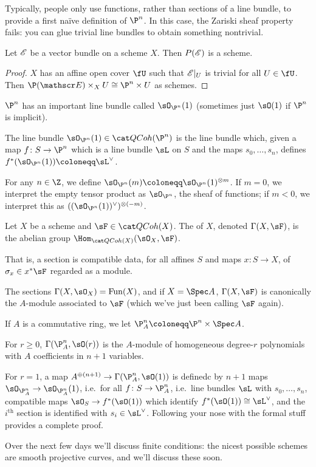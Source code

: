 Typically, people only use functions, rather than sections of a line bundle, to provide a first naïve definition of
$\P^n$. In this case, the Zariski sheaf property fails: you can glue trivial line bundles to obtain something
nontrivial.
\begin{cor}
Let $\mathscr E$ be a vector bundle on a scheme $X$. Then $P(\mathscr E)$ is a scheme.
\end{cor}
\begin{proof}
$X$ has an affine open cover $\fU$ such that $\mathscr E|_U$ is trivial for all $U\in\fU$. Then $\P(\sE)\times_X U\cong
\P^n\times U$ as schemes.
\end{proof}
$\P^n$ has an important line bundle called $\sO_{\P^n}(1)$ (sometimes just $\sO(1)$ if $\P^n$ is implicit).
\begin{defn}
The line bundle $\sO_{\P^n}(1)\in\QCoh(\P^n)$ is the line bundle which, given a map $f\colon S\to\P^n$ which is a
line bundle $\sL$ on $S$ and the maps $s_0,\dotsc,s_n$, defines $f^*(\sO_{\P^n}(1))\coloneqq\sL^\vee$.

For any $n\in\Z$, we define $\sO_{\P^n}(m)\coloneqq\sO_{\P^n}(1)^{\otimes m}$. If $m = 0$, we interpret the empty
tensor product as $\sO_{\P^n}$, the sheaf of functions; if $m < 0$, we interpret this as
$((\sO_{\P^n}(1))^\vee)^{\otimes(-m)}$.
\end{defn}
\begin{defn}
Let $X$ be a scheme and $\sF\in\QCoh(X)$. The  of $X$, denoted $\Gamma(X, \sF)$, is the abelian
group $\Hom_{\QCoh(X)}(\sO_X, \sF)$.
\end{defn}
That is, a section is compatible data, for all affines $S$ and maps $x\colon S\to X$, of $\sigma_x\in x^*\sF$
regarded as a module.

The sections $\Gamma(X,\sO_X) = \Fun(X)$, and if $X = \Spec A$, $\Gamma(X, \sF)$ is canonically the $A$-module
associated to $\sF$ (which we've just been calling $\sF$ again).
\begin{defn}
If $A$ is a commutative ring, we let $\P_A^n\coloneqq \P^n\times\Spec A$.
\end{defn}
\begin{prop}
For $r\ge 0$, $\Gamma(\P_A^n, \sO(r))$ is the $A$-module of homogeneous degree-$r$ polynomials with $A$
coefficients in $n+1$ variables.
\end{prop}
For $r = 1$, a map $A^{\oplus(n+1)}\to\Gamma(\P_A^n, \sO(1))$ is definedc by $n+1$ maps
$\sO_{\P_A^n}\to\sO_{\P_A^n}(1)$, i.e.\ for all $f\colon S\to\P_A^n$, i.e.\ line bundles $\sL$ with
$s_0,\dotsc,s_n$, compatible maps $\sO_S\to f^*(\sO(1))$ which identify $f^*(\sO(1))\cong\sL^\vee$, and the
$i^{\mathrm{th}}$ section is identified with $s_i\in\sL^\vee$. Following your nose with the formal stuff provides a
complete proof.

Over the next few days we'll discuss finite conditions: the nicest possible schemes are smooth projective curves,
and we'll discuss these soon.

